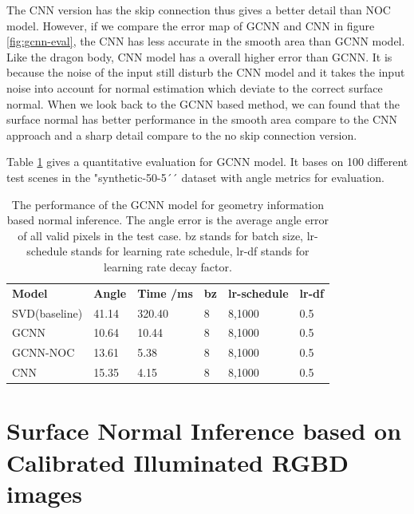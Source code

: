 \documentclass[border=15pt, multi, tikz]{article}
\newcommand{\tabhead}[1]{\textbf{#1}}
\begin{document}
The CNN version has the skip connection thus gives a better detail than NOC model. However, if we compare the error map of GCNN and CNN in figure \ref{fig:gcnn-eval}, the CNN has less accurate in the smooth area than GCNN model. Like the dragon body, CNN model has a overall higher error than GCNN. It is because the noise of the input still disturb the CNN model and it takes the input noise into account for normal estimation which deviate to the correct surface normal. When we look back to the GCNN based method, we can found that the surface normal has better performance in the smooth area compare to the CNN approach and a sharp detail compare to the no skip connection version.

Table \ref{tab:gcnn-eval} gives a quantitative evaluation for GCNN model. It bases on 100 different test scenes in the "synthetic-50-5´´ dataset with angle metrics for evaluation.



\begin{table}[H]
	
	\centering
	\begin{tabular}{l l l l l l }
		\tabhead{Model} & \tabhead{Angle} & \tabhead{Time /ms} & \tabhead{bz} & \tabhead{lr-schedule} & \tabhead{lr-df}\\
		SVD(baseline)  & 41.14  & 320.40 & 8 & 8,1000 & 0.5\\ 
		\hline
		GCNN  & 10.64  & 10.44 & 8 & 8,1000 & 0.5\\ 
		\hline
		GCNN-NOC & 13.61 & 5.38 & 8 & 8,1000 & 0.5\\
		\hline
		CNN & 15.35 & 4.15 & 8 & 8,1000 & 0.5\\
	\end{tabular}
	\caption{The performance of the GCNN model for geometry information based normal inference. The angle error is the average angle error of all valid pixels in the test case. bz stands for batch size, lr-schedule stands for learning rate schedule, lr-df stands for learning rate decay factor.}	
	\label{tab:gcnn-eval}
\end{table}





\newpage
\section{Surface Normal Inference based on Calibrated Illuminated RGBD images }
\end{document}
